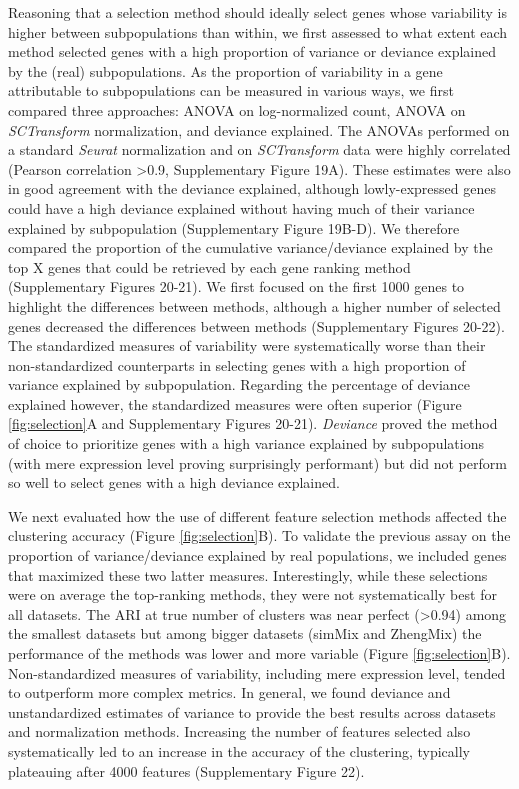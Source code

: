 \documentclass{bmcart}
\begin{document}
Reasoning that a selection method should ideally select genes whose variability is higher between subpopulations than within, we first assessed to what extent each method selected genes with a high proportion of variance or deviance explained by the (real) subpopulations. As the proportion of variability in a gene attributable to subpopulations can be measured in various ways, we first compared three approaches: ANOVA on log-normalized count, ANOVA on \textit{SCTransform} normalization, and deviance explained. The ANOVAs performed on a standard \textit{Seurat} normalization and on \textit{SCTransform} data were highly correlated (Pearson correlation >0.9, Supplementary Figure 19A). These estimates were also in good agreement with the deviance explained, although lowly-expressed genes could have a high deviance explained without having much of their variance explained by subpopulation (Supplementary Figure 19B-D). We therefore compared the proportion of the cumulative variance/deviance explained by the top X genes that could be retrieved by each gene ranking method (Supplementary Figures 20-21). We first focused on the first 1000 genes to highlight the differences between methods, although a higher number of selected genes decreased the differences between methods (Supplementary Figures 20-22). The standardized measures of variability were systematically worse than their non-standardized counterparts in selecting genes with a high proportion of variance explained by subpopulation. Regarding the percentage of deviance explained however, the standardized measures were often superior (Figure \ref{fig:selection}A and Supplementary Figures 20-21). \textit{Deviance} proved the method of choice to prioritize genes with a high variance explained by subpopulations (with mere expression level proving surprisingly performant) but did not perform so well to select genes with a high deviance explained.

We next evaluated how the use of different feature selection methods affected the clustering accuracy (Figure \ref{fig:selection}B). To validate the previous assay on the proportion of variance/deviance explained by real populations, we included genes that maximized these two latter measures. Interestingly, while these selections were on average the top-ranking methods, they were not systematically best for all datasets. The ARI at true number of clusters was near perfect (>0.94) among the smallest datasets but among bigger datasets (simMix and ZhengMix) the performance of the methods was lower and more variable (Figure \ref{fig:selection}B). Non-standardized measures of variability, including mere expression level, tended to outperform more complex metrics. In general, we found deviance and unstandardized estimates of variance to provide the best results across datasets and normalization methods. Increasing the number of features selected also systematically led to an increase in the accuracy of the clustering, typically plateauing after 4000 features (Supplementary Figure 22).
\end{document}
